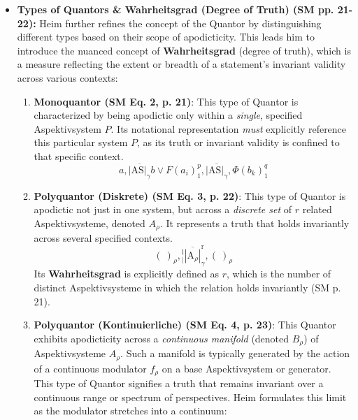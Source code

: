 \documentclass[12pt]{article}
\newcommand{\aspektivsystem}{P}
\begin{document}
\begin{itemize}
    \item \textbf{Types of Quantors \& Wahrheitsgrad (Degree of Truth) (SM pp. 21-22):}
    Heim further refines the concept of the Quantor by distinguishing different types based on their scope of apodicticity. This leads him to introduce the nuanced concept of \textbf{Wahrheitsgrad} (degree of truth), which is a measure reflecting the extent or breadth of a statement's invariant validity across various contexts:
    \begin{enumerate}
        \item \textbf{Monoquantor (SM Eq. 2, p. 21)}: This type of Quantor is characterized by being apodictic only within a \textit{single}, specified Aspektivsystem \( \aspektivsystem \). Its notational representation \textit{must} explicitly reference this particular system \( \aspektivsystem \), as its truth or invariant validity is confined to that specific context.
        \begin{equation}
        a, \overline{|\mathrm{AS}|_{\gamma}} b \lor F(a_i)^p_1 , \overline{|\mathrm{AS}|_{\gamma}} , \Phi(b_k)^q_1
        \label{eq:monoquantor_full}
        \tag{2}
        \end{equation}
        \item \textbf{Polyquantor (Diskrete) (SM Eq. 3, p. 22)}: This type of Quantor is apodictic not just in one system, but across a \textit{discrete set} of \( r \) related Aspektivsysteme, denoted \( A_\rho \). It represents a truth that holds invariantly across several specified contexts.
        \begin{equation}
        (\ )_\rho, \left. {}^{\mathrm{l}}_{|} \overline{|\mathrm{A}_\rho|} \right.^{\mathrm{r}}_\gamma, (\ )_\rho
        \label{eq:polyquantor_discrete_full}
        \tag{3}
        \end{equation}
        Its \textbf{Wahrheitsgrad} is explicitly defined as \( r \), which is the number of distinct Aspektivsysteme in which the relation holds invariantly (SM p. 21).
        \item \textbf{Polyquantor (Kontinuierliche) (SM Eq. 4, p. 23)}: This Quantor exhibits apodicticity across a \textit{continuous manifold} (denoted \( B_\rho \)) of Aspektivsysteme \( A_\rho \). Such a manifold is typically generated by the action of a continuous modulator \( f_\rho \) on a base Aspektivsystem or generator. This type of Quantor signifies a truth that remains invariant over a continuous range or spectrum of perspectives. Heim formulates this limit as the modulator stretches into a continuum:
        \begin{equation}

\end{equation}
\end{enumerate}
\end{itemize}
\end{document}
